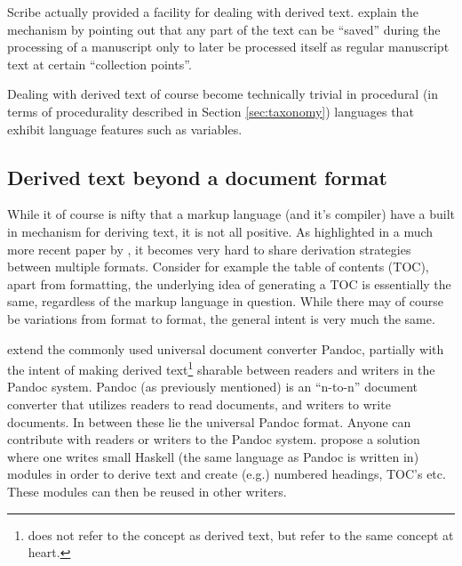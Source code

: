 \documentclass{scrreprt}
\begin{document}
Scribe actually provided a facility for dealing with derived text. \citet{reid} explain the mechanism by pointing out that any part of the text can be ``saved'' during the processing of a manuscript only to later be processed itself as regular manuscript text at certain ``collection points''.

Dealing with derived text of course become technically trivial in procedural (in terms of procedurality described in Section \ref{sec:taxonomy}) languages that exhibit language features such as variables.


\subsection{Derived text beyond a document format}
While it of course is nifty that a markup language (and it's compiler) have a built in mechanism for deriving text, it is not all positive. As highlighted in a much more recent paper by \citet{krijnen}, it becomes very hard to share derivation strategies between multiple formats. Consider for example the table of contents (TOC), apart from formatting, the underlying idea of generating a TOC is essentially the same, regardless of the markup language in question. While there may of course be variations from format to format, the general intent is very much the same.

\citet{krijnen} extend the commonly used universal document converter Pandoc\footnotePandoc, partially with the intent of making derived text\footnote{\citet{krijnen} does not refer to the concept as derived text, but refer to the same concept at heart.} sharable between readers and writers in the Pandoc system. Pandoc (as previously mentioned) is an ``n-to-n'' document converter that utilizes readers to read documents, and writers to write documents. In between these lie the universal Pandoc format. Anyone can contribute with readers or writers to the Pandoc system. \citet{krijnen} propose a solution where one writes small Haskell (the same language as Pandoc is written in) modules in order to derive text and create (e.g.) numbered headings, TOC's etc. These modules can then be reused in other writers.
\end{document}
